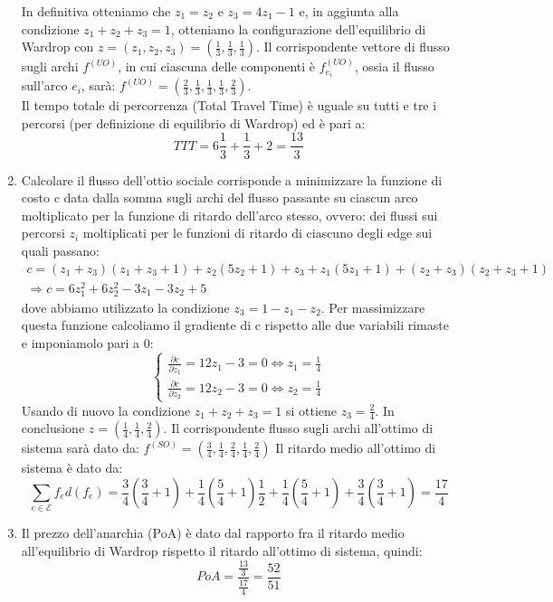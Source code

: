 \documentclass[11pt,largemargins]{homework}
\begin{document}
\begin{enumerate}[label=(\alph*)]
In definitiva otteniamo che $z_1=z_2$ e $z_3=4z_1-1$ e, in aggiunta alla condizione $z_1+z_2+z_3=1$, otteniamo la configurazione dell'equilibrio di Wardrop con $z=(z_1, z_2, z_3)=(\frac{1}{3}, \frac{1}{3}, \frac{1}{3})$. 
Il corrispondente vettore di flusso sugli archi $f^{(UO)}$, in cui ciascuna delle componenti è $f^{(UO)}_{e_i}$, ossia il flusso sull'arco $e_i$, sarà: $f^{(UO)}=(\frac{2}{3}, \frac{1}{3}, \frac{1}{3}, \frac{1}{3}, \frac{2}{3})$.\\

Il tempo totale di percorrenza (Total Travel Time) è uguale su tutti e tre i percorsi (per definizione di equilibrio di Wardrop) ed è pari a: \[TTT=6\frac{1}{3}+\frac{1}{3}+2=\frac{13}{3}\]
\item %
Calcolare il flusso dell'ottio sociale corrisponde a minimizzare la funzione di costo c data dalla somma sugli archi del flusso passante su ciascun arco moltiplicato per la funzione di ritardo dell'arco stesso, ovvero:
dei flussi sui percorsi $z_i$ moltiplicati per le funzioni di ritardo di ciascuno degli edge sui quali passano:
\begin{multline*}c= (z_1+z_3)(z_1+z_3+1)+z_2(5z_2+1)+z_3+z_1(5z_1+1)+(z_2+z_3)(z_2+z_3+1) \\ \Rightarrow c=6z_1^2+6z_2^2-3z_1-3z_2+5 \end{multline*}
dove abbiamo utilizzato la condizione $z_3=1-z_1-z_2$. Per massimizzare questa funzione calcoliamo il gradiente di c rispetto alle due variabili rimaste e imponiamolo pari a 0:
\[\begin{cases}\frac{\partial c}{\partial z_1} = 12z_1-3=0 \Leftrightarrow z_1=\frac{1}{4} \\
\frac{\partial c}{\partial z_2} =12z_2-3=0 \Leftrightarrow z_2=\frac{1}{4} \end{cases}\]
Usando di nuovo la condizione $z_1+z_2+z_3=1$ si ottiene $z_3=\frac{2}{4}$. In conclusione $z=(\frac{1}{4},\frac{1}{4}, \frac{2}{4})$.
Il corrispondente flusso sugli archi all'ottimo di sistema sarà dato da: $f^{(SO)}=(\frac{3}{4},\frac{1}{4},\frac{2}{4}, \frac{1}{4}, \frac{2}{4})$
Il ritardo medio all'ottimo di sistema è dato da: \[\sum_{e\in \mathcal{E}}f_e d(f_e)=\frac{3}{4}(\frac{3}{4}+1)+\frac{1}{4}(\frac{5}{4}+1)\frac{1}{2}+\frac{1}{4}(\frac{5}{4}+1)+\frac{3}{4}(\frac{3}{4}+1)=\frac{17}{4}\]

\item Il prezzo dell'anarchia (PoA) è dato dal rapporto fra il ritardo medio all'equilibrio di Wardrop rispetto il ritardo all'ottimo di sistema, quindi:
\[PoA=\frac{\frac{13}{3}}{\frac{17}{4}}=\frac{52}{51}\]


\end{enumerate}
\end{document}

